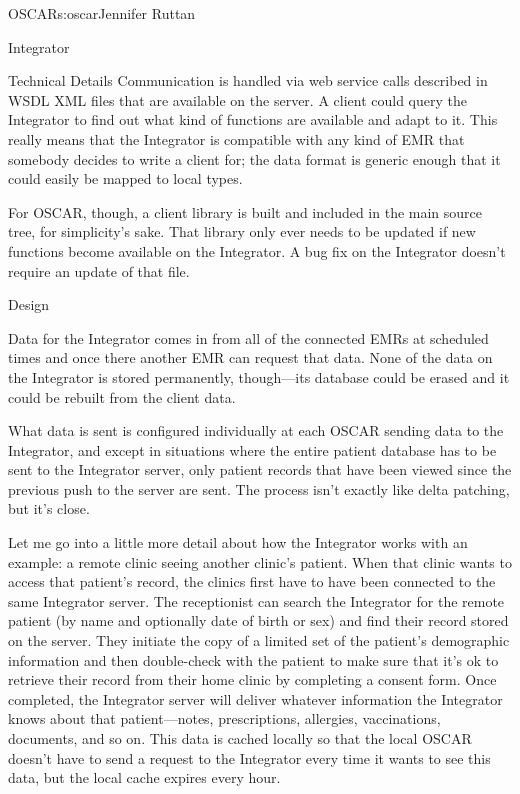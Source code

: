 \begin{aosachapter}{OSCAR}{s:oscar}{Jennifer Ruttan}
\begin{aosasect1}{Integrator}
\begin{aosasect2}{Technical Details}
Communication is handled via web service calls described in WSDL XML
files that are available on the server. A client could query the
Integrator to find out what kind of functions are available and adapt
to it. This really means that the Integrator is compatible with any
kind of EMR that somebody decides to write a client for; the data
format is generic enough that it could easily be mapped to local
types.

For OSCAR, though, a client library is built and included in the main
source tree, for simplicity's sake. That library only ever needs to be
updated if new functions become available on the Integrator. A bug fix
on the Integrator doesn't require an update of that file.

\end{aosasect2}

\begin{aosasect2}{Design}

Data for the Integrator comes in from all of the connected EMRs at
scheduled times and once there another EMR can request that data. None
of the data on the Integrator is stored permanently, though---its
database could be erased and it could be rebuilt from the client data.

What data is sent is configured individually at each OSCAR sending
data to the Integrator, and except in situations where the entire
patient database has to be sent to the Integrator server, only patient
records that have been viewed since the previous push to the server
are sent. The process isn't exactly like delta patching, but it's
close.


Let me go into a little more detail about how the Integrator works
with an example: a remote clinic seeing another clinic's patient. When
that clinic wants to access that patient's record, the clinics first
have to have been connected to the same Integrator server. The
receptionist can search the Integrator for the remote patient (by name
and optionally date of birth or sex) and find their record stored on
the server. They initiate the copy of a limited set of the patient's
demographic information and then double-check with the patient to make
sure that it's ok to retrieve their record from their home clinic by
completing a consent form. Once completed, the Integrator server will
deliver whatever information the Integrator knows about that
patient---notes, prescriptions, allergies, vaccinations, documents,
and so on. This data is cached locally so that the local OSCAR doesn't
have to send a request to the Integrator every time it wants to see
this data, but the local cache expires every hour.


\end{aosasect2}
\end{aosasect1}
\end{aosachapter}
